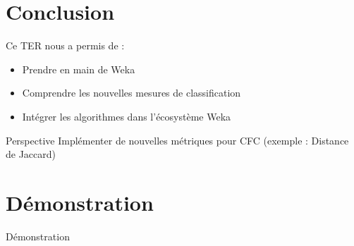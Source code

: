 \documentclass[12pt]{beamer}
\begin{document}
\section{Conclusion}
\begin{frame}
Ce TER nous a permis de :
\begin{itemize}
\item Prendre en main de Weka 
\item Comprendre les nouvelles mesures de classification
\item Intégrer les algorithmes dans l’écosystème Weka 
\end{itemize}
\begin{block}{Perspective}
Implémenter de nouvelles métriques pour CFC (exemple : Distance de Jaccard)
\end{block}

\end{frame}
\section{Démonstration}

\begin{frame}

\begin{center}
\huge Démonstration

\end{center}
\end{frame}
\end{document}
